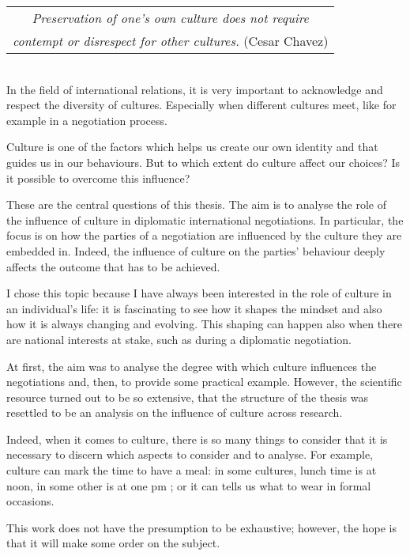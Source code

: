﻿\documentclass[../main.tex]{subfiles}
\begin{document}
  \begin{tabular}{c}
 \textit{Preservation of one's own culture does not require}\\
 \textit{contempt or disrespect for other cultures.} (Cesar Chavez)\\
  \end{tabular}\\


In the field of international relations, it is very important to acknowledge and respect the diversity of cultures. Especially when different cultures meet, like for example in a negotiation process.

Culture is one of the factors which helps us create our own identity and that guides us in our behaviours. But to which extent do culture affect our choices? Is it possible to overcome this influence?

These are the central questions of this thesis. The aim is to analyse the role of the influence of culture in diplomatic international negotiations. In particular, the focus is on how the parties of a negotiation are influenced by the culture they are embedded in. Indeed, the influence of culture on the parties' behaviour deeply affects the outcome that has to be achieved.

I chose this topic because I have always been interested in the role of culture in an individual's life: it is fascinating to see how it shapes the mindset and also how it is always changing and evolving. This shaping can happen also when there are national interests at stake, such as during a diplomatic negotiation.

At first, the aim was to analyse the degree with which culture influences the negotiations and, then, to provide some practical example. However, the scientific resource turned out to be so extensive, that the structure of the thesis was resettled to be an analysis on the influence of culture across research.

Indeed, when it comes to culture, there is so many things to consider that it is necessary to discern which aspects to consider and to analyse. For example, culture can mark the time to have a meal: in some cultures, lunch time is at noon, in some other is at one pm \autocite[7]{helen}; or it can tells us what to wear in formal occasions.

This work does not have the presumption to be exhaustive; however, the hope is that it will make some order on the subject.\\
\end{document}
